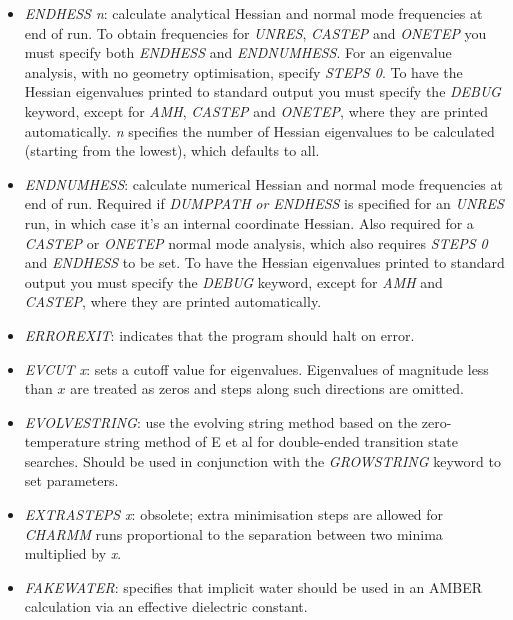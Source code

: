 \documentclass[12pt,a4paper,dvips]{article}
\begin{document}
\begin{itemize}
\item {\it ENDHESS n\/}: calculate analytical Hessian and normal mode
frequencies at end of run. To obtain frequencies for {\it UNRES\/},
{\it CASTEP\/} and {\it ONETEP} you must
specify both {\it ENDHESS\/} and {\it ENDNUMHESS\/}.
For an eigenvalue analysis, with no geometry optimisation, specify {\it STEPS 0\/}.
To have the Hessian eigenvalues printed to standard output you must specify the 
{\it DEBUG\/} keyword, except for {\it AMH\/}, {\it CASTEP\/} and {\it ONETEP\/}, where they are printed
automatically. {\it n\/} specifies the number of Hessian eigenvalues to be calculated 
(starting from the lowest), which defaults to all.

\item {\it ENDNUMHESS\/}: calculate numerical Hessian and normal mode
frequencies at end of run.
Required if {\it DUMPPATH\/} {\it or ENDHESS\/} is specified for an {\it UNRES\/} run,
in which case it's an internal coordinate Hessian.
Also required for a {\it CASTEP\/} or {\it ONETEP} normal mode analysis, which
also requires {\it STEPS 0\/} and {\it ENDHESS\/} to be set.
To have the Hessian eigenvalues printed to standard output you must specify the 
{\it DEBUG\/} keyword, except for {\it AMH\/} and {\it CASTEP\/}, where they are printed
automatically. 

\item {\it ERROREXIT\/}: indicates that the program should halt on error.

\item {\it EVCUT x\/}: sets a cutoff value for eigenvalues. Eigenvalues
of magnitude less than $x$ are treated as zeros and steps along such directions
are omitted.

\item {\it EVOLVESTRING\/}: use the evolving string method based on the
  zero-temperature string method of E et al \cite{ERV02} for double-ended
  transition state searches. Should be used in conjunction with the {\it %
  GROWSTRING} keyword to set parameters. 

\item {\it EXTRASTEPS x\/}: obsolete; extra minimisation steps are allowed
for {\it CHARMM\/} runs proportional to the separation between two minima
multiplied by {\it x\/}.

\item {\it FAKEWATER\/}: specifies that implicit water should be used in an AMBER
calculation via an effective dielectric constant.
 

\end{itemize}
\end{document}
